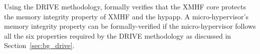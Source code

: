 Using the \textsc{DRIVE} methodology, \cite{vasudevan2013design} formally verifies that the XMHF core protects the memory integrity property of XMHF and the hypapp. A micro-hypervisor's memory integrity property can be formally-verified if the micro-hypervisor  follows all the six properties required by the \textsc{DRIVE} methodology as discussed in Section~\ref{sec:bg_drive}.

